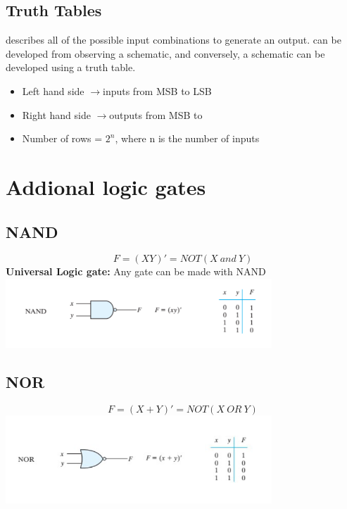 \documentclass[a4paper,12pt]{article}
\newcommand{\ra}{$\rightarrow$}
\begin{document}
            \subsection*{Truth Tables}
            describes all of the possible input combinations to generate an output. can be developed from observing a schematic, and conversely, a schematic can be developed using a truth table.
            \begin{itemize}
                \item Left hand side \ra inputs from MSB to LSB
                \item Right hand side \ra outputs from MSB to
                \item Number of rows = $2^n$, where n is the number of inputs
            \end{itemize}
            
            \section{Addional logic gates}
                \subsection*{NAND}
                    \[F=(XY)'=NOT(X~and~Y)\]
                    \textbf{Universal Logic gate:} Any gate can be made with NAND
                    \vspace{10pt}\\
                    \includegraphics*[width=10cm]{NAND.png}
                    
                \subsection*{NOR}
                \[F=(X+Y)'=NOT(X~OR~Y)\]
                \includegraphics*[width=10cm]{NOR.png}
\end{document}
